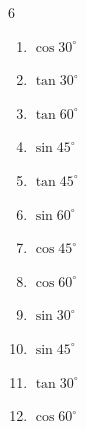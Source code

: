 \begin{multicols}{6}
\begin{enumerate}

\columnbreak %

  \item $\displaystyle \cos{30^\circ}$


  \item $\displaystyle \tan{30^\circ}$


  \item $\displaystyle \tan{60^\circ}$


  \item $\displaystyle \sin{45^\circ}$


  \item $\displaystyle \tan{45^\circ}$

        \phantom{$\displaystyle =1$}

  \item $\displaystyle \sin{60^\circ}$


  \item $\displaystyle \cos{45^\circ}$


  \item $\displaystyle \cos{60^\circ}$


  \item $\displaystyle \sin{30^\circ}$


  \item $\displaystyle \sin{45^\circ}$


  \item $\displaystyle \tan{30^\circ}$


  \item $\displaystyle \cos{60^\circ}$



\end{enumerate}
\end{multicols}
